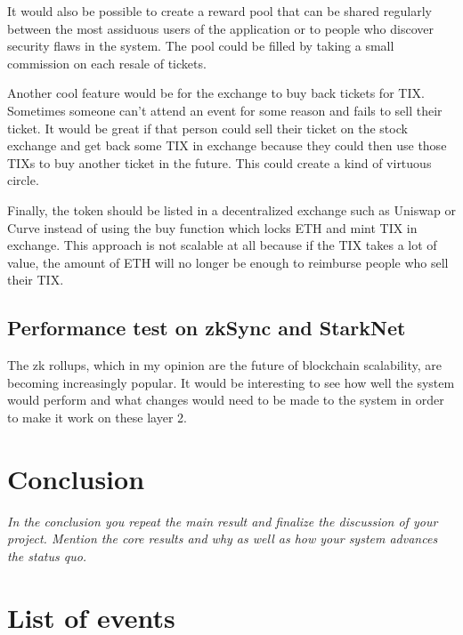\documentclass[a4paper,11pt,oneside]{report}
\begin{document}
It would also be possible to create a reward pool that can be shared regularly between the most assiduous users of the application or to people who discover security flaws in the system. The pool could be filled by taking a small commission on each resale of tickets.

Another cool feature would be for the exchange to buy back tickets for TIX. Sometimes someone can't attend an event for some reason and fails to sell their ticket. It would be great if that person could sell their ticket on the stock exchange and get back some TIX in exchange because they could then use those TIXs to buy another ticket in the future. This could create a kind of virtuous circle.

Finally, the token should be listed in a decentralized exchange such as Uniswap or Curve instead of using the buy function which locks ETH and mint TIX in exchange. This approach is not scalable at all because if the TIX takes a lot of value, the amount of ETH will no longer be enough to reimburse people who sell their TIX.

\section{Performance test on zkSync and StarkNet}
The zk rollups, which in my opinion are the future of blockchain scalability, are becoming increasingly popular. It would be interesting to see how well the system would perform and what changes would need to be made to the system in order to make it work on these layer 2.

\chapter{Conclusion}

\textit{In the conclusion you repeat the main result and finalize the discussion of
your project. Mention the core results and why as well as how your system
advances the status quo.} \\




\cleardoublepage
{}
{}
\nocite{*}
\printbibliography

\appendix
\chapter{List of events}
\label{sec:appendix_a}
\end{document}
